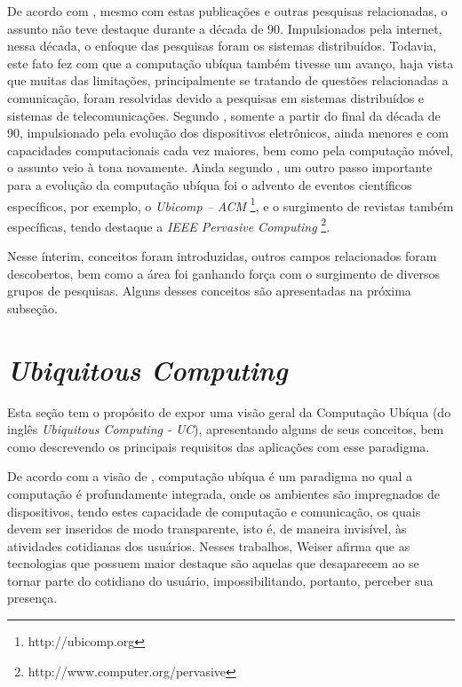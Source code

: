 De acordo com \cite{campiolo2005}, mesmo com estas publicações e outras pesquisas relacionadas, o assunto não teve destaque durante a década de 90. Impulsionados pela internet, nessa década, o enfoque das pesquisas foram os sistemas distribuídos. Todavia, este fato fez com que a computação ubíqua também tivesse um avanço, haja vista que muitas das limitações, principalmente se tratando de questões relacionadas a comunicação, foram resolvidas devido a pesquisas em sistemas distribuídos e sistemas de telecomunicações. Segundo \cite{campiolo2005}, somente a partir do final da década de 90, impulsionado pela evolução dos dispositivos eletrônicos, ainda menores e com capacidades computacionais cada vez maiores, bem como pela computação móvel, o assunto veio à tona novamente.  Ainda segundo \cite{campiolo2005}, um outro passo importante para a evolução da computação ubíqua foi o advento de eventos científicos específicos, por exemplo, o \textit{Ubicomp – ACM} \footnote{http://ubicomp.org}, e o surgimento de revistas também específicas, tendo destaque a  \textit{IEEE Pervasive Computing} \footnote{http://www.computer.org/pervasive}.  

Nesse ínterim, conceitos foram introduzidas, outros campos relacionados foram descobertos, bem como a área foi ganhando força com o surgimento de diversos grupos de pesquisas. Alguns desses conceitos são apresentadas na próxima subseção. 


\section{\textit{Ubiquitous Computing}}
\label{sc:definicoes}

Esta seção tem o propósito de expor uma visão geral da Computação Ubíqua (do inglês \textit{Ubiquitous Computing - UC}), apresentando alguns de seus conceitos, bem como descrevendo os principais requisitos das aplicações com esse paradigma.

De acordo com a visão de \cite{weiser1991,weiser1993},  computação ubíqua é um paradigma no qual a computação é profundamente integrada, onde os ambientes são impregnados de dispositivos, tendo estes capacidade de computação e comunicação, os quais devem ser inseridos de modo transparente, isto é, de maneira invisível, às atividades cotidianas dos usuários. Nesses trabalhos,  Weiser afirma que as tecnologias que possuem maior destaque são aquelas que desaparecem ao se tornar parte do cotidiano do usuário, impossibilitando, portanto, perceber sua presença.

